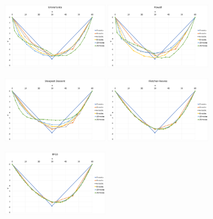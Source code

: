 \documentclass[10pt, a4paper]{article}
\begin{document}
\begin{figure}[H]
  \centering
  \begin{subfigure}[b]{\textwidth}
    \includegraphics[width=0.49\textwidth]{figuras/q2bUnivGraf.png}
    \includegraphics[width=0.49\textwidth]{figuras/q2bPowellGraf.png}
  \end{subfigure}
  \begin{subfigure}[b]{\textwidth}
    \includegraphics[width=0.49\textwidth]{figuras/q2bSteepDGraf.png}
    \includegraphics[width=0.49\textwidth]{figuras/q2bFRGraf.png}
  \end{subfigure}
  \begin{subfigure}[b]{\textwidth}
    \includegraphics[width=0.49\textwidth]{figuras/q2bBFGSGraf.png}

\end{subfigure}
\end{figure}
\end{document}
